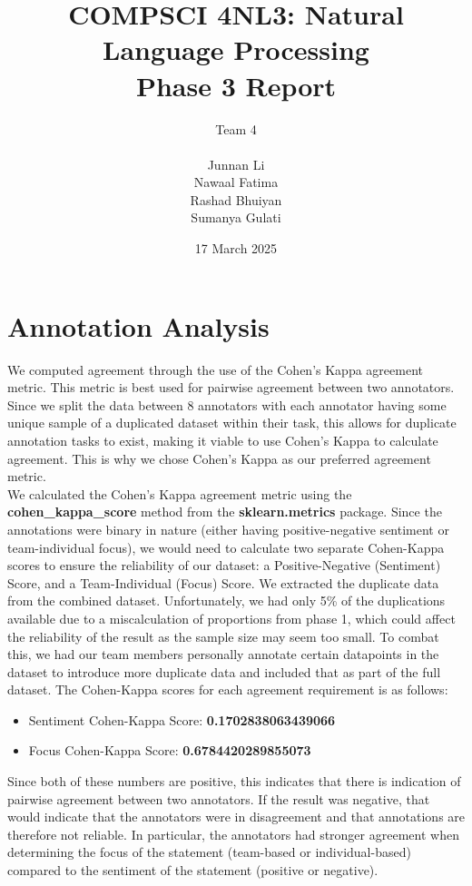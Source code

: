\documentclass[titlepage]{article}
\title{COMPSCI 4NL3: Natural Language Processing\\
Phase 3 Report}
\author{Team 4\\
  \\ Junnan Li
  \\ Nawaal Fatima
  \\ Rashad Bhuiyan
\\ Sumanya Gulati}
\date{17 March 2025}
\begin{document}
\begin{titlepage}
  \maketitle
\end{titlepage}

\newpage

\tableofcontents

\newpage

\section{Annotation Analysis}
We computed agreement through the use of the Cohen's Kappa agreement
metric. This metric is best used for pairwise agreement between two annotators.
Since we split the data between 8 annotators with each annotator
having some unique sample of a duplicated dataset within their task,
this allows for
duplicate annotation tasks to exist, making it viable to use Cohen's
Kappa to calculate agreement. This is why we chose Cohen's Kappa as
our preferred
agreement metric. \\
\newline
We calculated the Cohen's Kappa agreement metric using the
\textbf{cohen\_kappa\_score} method from the \textbf{sklearn.metrics} package.
Since the annotations were binary in nature (either having
positive-negative sentiment or team-individual focus), we would need
to calculate two
separate Cohen-Kappa scores to ensure the reliability of our dataset:
a Positive-Negative (Sentiment) Score, and a Team-Individual (Focus) Score.
We extracted the duplicate data from the combined dataset.
Unfortunately, we had only 5\% of the duplications available due to a
miscalculation of
proportions from phase 1, which could affect the reliability of the
result as the sample size may seem too small. To combat this, we had our team
members personally annotate certain datapoints in the dataset to
introduce more duplicate data and included that as part of the full dataset.
The Cohen-Kappa scores for each agreement requirement is as follows:
\begin{itemize}
  \item Sentiment Cohen-Kappa Score: \textbf{0.1702838063439066}
  \item Focus Cohen-Kappa Score: \textbf{0.6784420289855073}
\end{itemize}
Since both of these numbers are positive, this indicates that there
is indication of pairwise agreement between two annotators. If the result
was negative, that would indicate that the annotators were in
disagreement and that annotations are therefore not reliable. In particular, the
annotators had stronger agreement when determining the focus of the
statement (team-based or individual-based) compared to the sentiment of the
statement (positive or negative).
\end{document}
